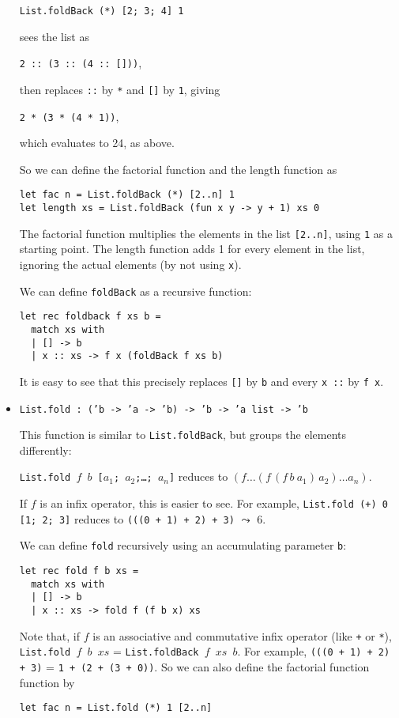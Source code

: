 \documentclass[a4paper]{article}
\begin{document}
\begin{itemize}
\begin{verbatim}
List.foldBack (*) [2; 3; 4] 1
\end{verbatim}

sees the list as

\texttt{2\,::\,(3\,::\,(4\,::\,[]))},

then replaces \texttt{::} by \texttt{*} and \texttt{[]} by \texttt{1},
giving

\texttt{2 * (3 * (4 * 1))},

which evaluates to 24, as above.

So we can define the factorial function and the length function as

\begin{verbatim}
let fac n = List.foldBack (*) [2..n] 1
let length xs = List.foldBack (fun x y -> y + 1) xs 0
\end{verbatim}

The factorial function multiplies the elements in the list
\texttt{[2..n]}, using \texttt{1} as a starting point.  The length
function adds 1 for every element in the list, ignoring the actual
elements (by not using \texttt{x}).

We can define \texttt{foldBack} as a recursive function:


\begin{verbatim}
let rec foldback f xs b =
  match xs with
  | [] -> b
  | x :: xs -> f x (foldBack f xs b)
\end{verbatim}

It is easy to see that this precisely replaces \texttt{[]} by
\texttt{b} and every \texttt{x ::} by \texttt{f x}.


\item \texttt{List.fold : ('b -> 'a -> 'b) -> 'b -> 'a list -> 'b}

This function is similar to \texttt{List.foldBack}, but groups the
elements differently:

\texttt{List.fold $f$ $b$ [$a_1$; $a_2$;\ldots; $a_n$]} reduces to
$(f\ldots(f\,(f\,b~a_1)\,a_2)\ldots a_n)$.

If $f$ is an infix operator, this is easier to see.  For example,
\texttt{List.fold (+) 0 [1; 2; 3]} reduces to \texttt{(((0 + 1) + 2) +
  3)} $\leadsto$ 6.

We can define \texttt{fold} recursively using an accumulating
parameter \texttt{b}:

\begin{verbatim}
let rec fold f b xs =
  match xs with
  | [] -> b
  | x :: xs -> fold f (f b x) xs
\end{verbatim}

Note that, if $f$ is an associative and commutative infix operator
(like \texttt{+} or \texttt{*}), \texttt{List.fold $f$ $b$ $xs$} =
\texttt{List.foldBack $f$ $xs$ $b$}.  For example, \texttt{(((0 + 1) +
  2) + 3)} = \texttt{1 + (2 + (3 + 0))}.  So we can also define the
factorial function function by

\begin{verbatim}
let fac n = List.fold (*) 1 [2..n]
\end{verbatim}

\end{itemize}
\end{document}
